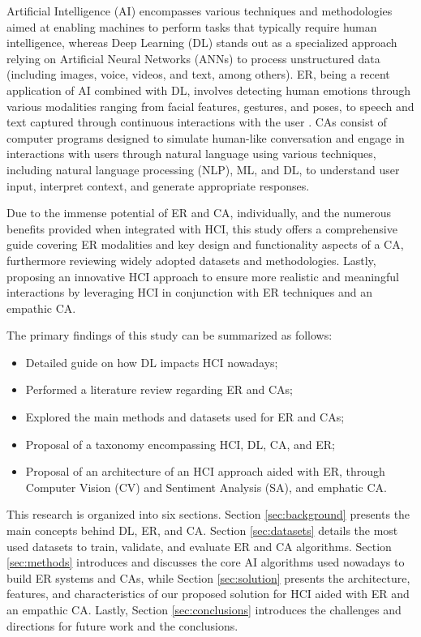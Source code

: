 \documentclass[runningheads]{llncs}
\begin{document}
Artificial Intelligence (AI) encompasses various techniques and methodologies aimed at enabling machines to perform tasks that typically require human intelligence, whereas Deep Learning (DL) stands out as a specialized approach relying on Artificial Neural Networks (ANNs) to process unstructured data (including images, voice, videos, and text, among others). ER, being a recent application of AI combined with DL, involves detecting human emotions through various modalities ranging from facial features, gestures, and poses, to speech and text captured through continuous interactions with the user \cite{alrowais_modified_2023}.  CAs consist of computer programs designed to simulate human-like conversation and engage in interactions with users through natural language using various techniques, including natural language processing (NLP), ML, and DL, to understand user input, interpret context, and generate appropriate responses.
 
Due to the immense potential of ER and CA, individually, and the numerous benefits provided when integrated with HCI, this study offers a comprehensive guide covering ER modalities and key design and functionality aspects of a CA, furthermore reviewing widely adopted datasets and methodologies. Lastly, proposing an innovative HCI approach to ensure more realistic and meaningful interactions by leveraging HCI in conjunction with ER techniques and an empathic CA.
 
The primary findings of this study can be summarized as follows:
\begin{itemize}
	\item Detailed guide on how DL impacts HCI nowadays;
	\item Performed a literature review regarding ER and CAs;
	\item Explored the main methods and datasets used for ER and CAs;
	\item Proposal of a taxonomy encompassing HCI, DL, CA, and ER;
	\item Proposal of an architecture of an HCI approach aided with ER, through Computer Vision (CV) and Sentiment Analysis (SA), and emphatic CA.
\end{itemize}

This research is organized into six sections. Section \ref{sec:background} presents the main concepts behind DL, ER, and CA. Section \ref{sec:datasets} details the most used datasets to train, validate, and evaluate ER and CA algorithms. Section \ref{sec:methods} introduces and discusses the core AI algorithms used nowadays to build ER systems and CAs, while Section \ref{sec:solution} presents the architecture, features, and characteristics of our proposed solution for HCI aided with ER and an empathic CA. Lastly, Section \ref{sec:conclusions}  introduces the challenges and directions for future work and the conclusions. 
\end{document}
